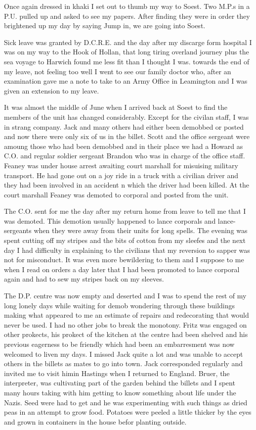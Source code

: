 Once again dressed in khaki I set out to thumb my way to Soest. Two
M.P.s in a P.U. pulled up and asked to see my papers. After finding
they were in order they brightened up my day by saying Jump in, we are
going into Soest.

Sick leave was granted by D.C.R.E. and the day after my discarge form
hospital I was on my way to the Hook of Hollan, that long tiring
overland journey plus the sea voyage to Harwich found me less fit than
I thought I was. towards the end of my leave, not feeling too well I
went to see our family doctor who, after an examination gave me a note
to take to an Army Office in Leamington and I was given an extension
to my leave.

It was almost the middle of June when I arrived back at Soest to find
the members of the unit has changed considerably. Except for the
civilan staff, I was in strang company. Jack and many others had
either been demobbed or posted and now there were only six of us in
the billet. \Captain Scott and the office sergeant were amoung those
who had been demobbed and in their place we had a \captain Howard as
C.O. and regular soldier sergeant Brandon who was in charge of the
office staff. \Sergeant Feaney was under house arrest awaiting court
marshall for misuising military transport. He had gone out on a joy
ride in a truck with a civilian driver and they had been involved in
an accident n which the driver had been killed. At the court marshall
Feaney was demoted to corporal and posted from the unit.

The C.O. sent for me the day after my return home from leave to tell
me that I was demoted. This demotion usually happened to lance
corporals and lance-sergeants when they were away from their units for
long spells. The evening was spent cutting off my stripes and the bits
of cotton from my sleefes and the next day I had difficulty in
explaining to the civilians that my reversion to sapper was not for
misconduct. It was even more bewildering to them and I suppose to me
when I read on orders a day later that I had been promoted to lance
corporal again and had to sew my stripes back on my sleeves.

The D.P. centre was now empty and deserted and I was to spend the rest
of my long lonely days while waiting for demob wondering through
these buildings making what appeared to me an estimate of repairs and
redecorating that would never be used. I had no other jobs to break
the monotony. Fritz was engaged on other prokects, his prokect of the
kitchen at the centre had been shelved and his previous eagerness to
be friendly which had been an embarresment was now welcomed to liven
my days. I missed Jack quite a lot and was unable to accept others in
the billets as mates to go into town. Jack corresponded regularly and
invited me to visit himin Hastings when I returned to England. Bruer,
the interpreter, was cultivating part of the garden behind the billets
and I spent many hours taking with him getting to know something about
life under the Nazis. Seed were had to get and he was experimenting
with such things as dried peas in an attempt to grow food. Potatoes
were peeled a little thicker by the eyes and grown in containers in
the house befor planting outside.

